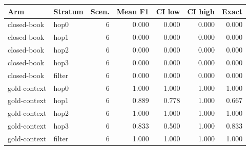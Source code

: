\begin{tabular}{llrrrrr}
\toprule
Arm & Stratum & Scen. & Mean F1 & CI low & CI high & Exact \\
\midrule
closed-book & hop0 & 6 & 0.000 & 0.000 & 0.000 & 0.000 \\
closed-book & hop1 & 6 & 0.000 & 0.000 & 0.000 & 0.000 \\
closed-book & hop2 & 6 & 0.000 & 0.000 & 0.000 & 0.000 \\
closed-book & hop3 & 6 & 0.000 & 0.000 & 0.000 & 0.000 \\
closed-book & filter & 6 & 0.000 & 0.000 & 0.000 & 0.000 \\
gold-context & hop0 & 6 & 1.000 & 1.000 & 1.000 & 1.000 \\
gold-context & hop1 & 6 & 0.889 & 0.778 & 1.000 & 0.667 \\
gold-context & hop2 & 6 & 1.000 & 1.000 & 1.000 & 1.000 \\
gold-context & hop3 & 6 & 0.833 & 0.500 & 1.000 & 0.833 \\
gold-context & filter & 6 & 1.000 & 1.000 & 1.000 & 1.000 \\
\bottomrule
\end{tabular}
